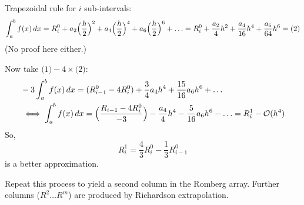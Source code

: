 \begin{enumerate}
{        Trapezoidal rule for $i$ sub-intervals:
        \[
            \int_a^b f(x) \,dx = R_{i}^0 + a_2 \Bigl(\frac{h}{2}\Bigr)^2 + 
            a_4 \Bigl(\frac{h}{2}\Bigr)^4 + a_6 \Bigl(\frac{h}{2}\Bigr)^6 + \ldots = 
            R_i^0 + \frac{a_2}{4} h^2 + \frac{a_4}{16} h^4 + \frac{a_6}{64} h^6
            = \text{(2)}
        \]
        (No proof here either.)

        Now take $\text{(1)} - 4 \times \text{(2)}$:
        \begin{align*}
            &-3 \int_a^b f(x) \,dx = (R_{i-1}^0 - 4R_i^0) + \frac{3}{4} a_4 h^4 + 
            \frac{15}{16} a_6 h^6 + \dots
            \\& \iff 
            \int_a^b f(x) \,dx = \Bigl(\frac{R_{i-1} - 4R_i^0}{-3}\Bigr) - 
            \frac{a_4}{4} h^4 - \frac{5}{16} a_6 h^6 - \ldots = 
            R_i^1 - \mathcal{O}(h^4)
        \end{align*}
        So,
        \[R_i^1 = \frac{4}{3} R_i^0 - \frac{1}{3} R_{i-1}^0 \]
        is a better approximation.

        Repeat this process to yield a second column in the Romberg array.
        Further columns ($R^2 \dots R^m$) are produced by Richardson extrapolation.
        \begin{center}
        \end{center}
    }
\end{enumerate}
